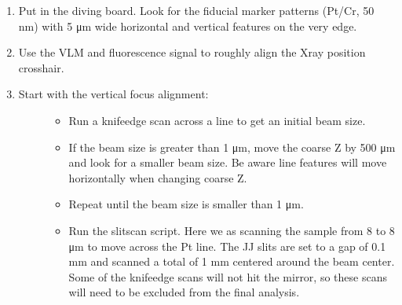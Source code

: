 \documentclass[letterpaper,10pt,english]{sphinxmanual}
\begin{document}
\begin{itemize}
\begin{description}
\begin{enumerate}
\begin{description}
\begin{itemize}
\item {} 
\sphinxAtStartPar
Move in the horizontal mirror. Check that the mirror is flat and set to zero. Move to middle of the X\sphinxhyphen{}ray beam.

\item {} 
\sphinxAtStartPar
Pitch the vertical mirror to 3 mrad. Translate the mirror down by 0.63 mm.

\item {} 
\sphinxAtStartPar
Pitch the horizontal mirror to 3 mrad. Translate the mirror outboard by 0.15 mm.

\item {} 
\sphinxAtStartPar
Check that the focused beam can be seen by the Merlin and the VLM is not blocking the focused beam. VLM positions June 2021 (X, Y, Z) = (\sphinxhyphen{}0.090, \sphinxhyphen{}0.380, \sphinxhyphen{}1.357)

\end{itemize}

\end{description}

\item {} 
\sphinxAtStartPar
Put in the diving board. Look for the fiducial marker patterns (Pt/Cr, 50 nm) with 5 μm wide horizontal and vertical features on the very edge.

\item {} 
\sphinxAtStartPar
Use the VLM and fluorescence signal to roughly align the X\sphinxhyphen{}ray position cross\sphinxhyphen{}hair.

\item {} \begin{description}
\item[{Start with the vertical focus alignment:}] \leavevmode\begin{itemize}
\item {} 
\sphinxAtStartPar
Run a knife\sphinxhyphen{}edge scan across a line to get an initial beam size. 

\item {} 
\sphinxAtStartPar
If the beam size is greater than 1 μm, move the coarse Z by 500 μm and look for a smaller beam size. Be aware line features will move horizontally when changing coarse Z.

\item {} 
\sphinxAtStartPar
Repeat until the beam size is smaller than 1 μm.

\item {} 
\sphinxAtStartPar
Run the slit\sphinxhyphen{}scan script. Here we as scanning the sample from \sphinxhyphen{}8 to 8 μm to move across the Pt line. The JJ slits are set to a gap of 0.1 mm and scanned a total of 1 mm centered around the beam center. Some of the knife\sphinxhyphen{}edge scans will not hit the mirror, so these scans will need to be excluded from the final analysis. 


\end{itemize}
\end{description}
\end{enumerate}
\end{description}
\end{itemize}
\end{document}

